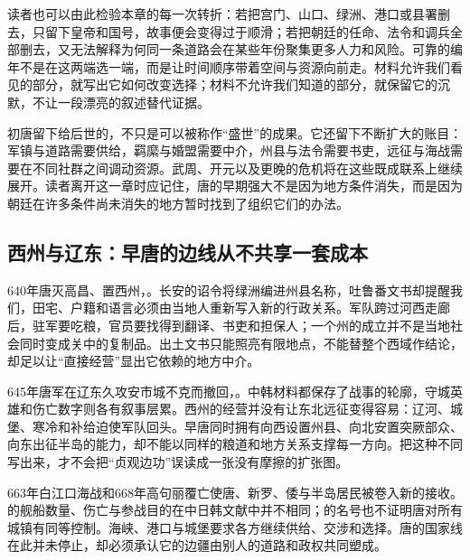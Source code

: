 读者也可以由此检验本章的每一次转折：若把宫门、山口、绿洲、港口或县署删去，只留下皇帝和国号，故事便会变得过于顺滑；若把朝廷的任命、法令和调兵全部删去，又无法解释为何同一条道路会在某些年份聚集更多人力和风险。可靠的编年不是在这两端选一端，而是让时间顺序带着空间与资源向前走。材料允许我们看见的部分，就写出它如何改变选择；材料不允许我们知道的部分，就保留它的沉默，不让一段漂亮的叙述替代证据。

初唐留下给后世的，不只是可以被称作“盛世”的成果。它还留下不断扩大的账目：军镇与道路需要供给，羁縻与婚盟需要中介，州县与法令需要书吏，远征与海战需要在不同社群之间调动资源。武周、开元以及更晚的危机将在这些既成联系上继续展开。读者离开这一章时应记住，唐的早期强大不是因为地方条件消失，而是因为朝廷在许多条件尚未消失的地方暂时找到了组织它们的办法。

\subsection{西州与辽东：早唐的边线从不共享一套成本}
640年唐灭高昌、置西州，。长安的诏令将绿洲编进州县名称，吐鲁番文书却提醒我们，田宅、户籍和语言必须由当地人重新写入新的行政关系。军队跨过河西走廊后，驻军要吃粮，官员要找得到翻译、书吏和担保人；一个州的成立并不是当地社会同时变成关中的复制品。出土文书只能照亮有限地点，不能替整个西域作结论，却足以让“直接经营”显出它依赖的地方中介。

645年唐军在辽东久攻安市城不克而撤回，。中韩材料都保存了战事的轮廓，守城英雄和伤亡数字则各有叙事层累。西州的经营并没有让东北远征变得容易：辽河、城堡、寒冷和补给迫使军队回头。早唐同时拥有向西设置州县、向北安置突厥部众、向东出征半岛的能力，却不能以同样的粮道和地方关系支撑每一方向。把这种不同写出来，才不会把“贞观边功”误读成一张没有摩擦的扩张图。

663年白江口海战和668年高句丽覆亡使唐、新罗、倭与半岛居民被卷入新的接收。的舰船数量、伤亡与参战目的在中日韩文献中并不相同；的名号也不证明唐对所有城镇有同等控制。海峡、港口与城堡要求各方继续供给、交涉和选择。唐的国家线在此并未停止，却必须承认它的边疆由别人的道路和政权共同塑成。
